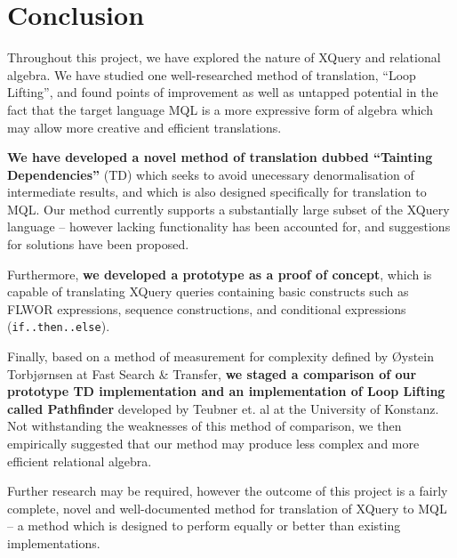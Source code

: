 \chapter{Conclusion}
\label{chapter:conclusion}
Throughout this project, we have explored the nature of XQuery and relational
algebra. We have studied one well-researched method of translation, ``Loop
Lifting'', and found points of improvement as well as untapped potential in the
fact that the target language MQL is a more expressive form of algebra
which may allow more creative and efficient translations.

\textbf{We have developed a novel method of translation dubbed ``Tainting
Dependencies''} (TD) which seeks to avoid unecessary denormalisation of
intermediate results, and which is also designed specifically for translation
to MQL. Our method currently supports a substantially large subset of the XQuery
language -- however lacking functionality has been accounted for, and suggestions for
solutions have been proposed.

Furthermore, \textbf{we developed a prototype as a proof of concept}, which is
capable of translating XQuery queries containing basic constructs such as FLWOR
expressions, sequence constructions, and conditional expressions
(\texttt{if..then..else}).

Finally, based on a method of measurement for complexity defined by \O ystein
Torbj\o rnsen at Fast Search \& Transfer, \textbf{we staged a comparison of our prototype TD
implementation and an implementation of Loop Lifting called Pathfinder}
developed by Teubner et. al at the University of Konstanz. Not withstanding the
weaknesses of this method of comparison, we then empirically suggested that
our method may produce less complex and more efficient relational algebra.

Further research may be required, however the outcome of this project is a
fairly complete, novel and well-documented method for translation of XQuery to
MQL -- a method which is designed to perform equally or better than existing
implementations.

% 
